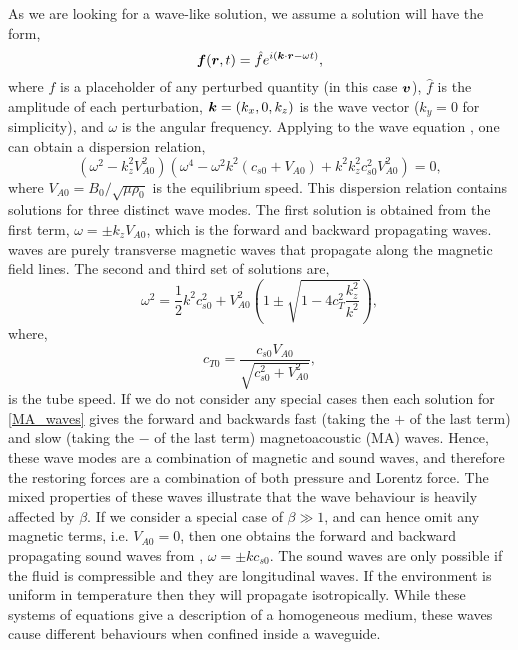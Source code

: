 As we are looking for a wave-like solution, we assume a solution will have the form,
\begin{equation}\label{wave_plane_sol}
    \boldsymbol{f}(\boldsymbol{r},t) = \hat{f} e^{i( \boldsymbol{k}\cdot \boldsymbol{r} - \omega t)},
\end{equation}
where $f$ is a placeholder of any perturbed quantity (in this case $\boldsymbol{v}$), $\hat{f}$ is the amplitude of each perturbation, $\boldsymbol{k}=(k_x,0,k_z)$ is the wave vector ($k_y=0$ for simplicity), and $\omega$ is the angular frequency. Applying  to the wave equation , one can obtain a dispersion relation,
\begin{equation}\label{disp_rel}
 (\omega^2-k^2_z V_{A0}^2)(\omega^4-\omega^2k^2(c_{s0}+V_{A0})+k^2 k^2_z c_{s0}^2 V_{A0}^2) = 0,
\end{equation}
where $V_{A0}=B_0/\sqrt{\mu \rho_0}$ is the equilibrium \Alfven speed. This dispersion relation contains solutions for three distinct wave modes. The first solution is obtained from the first term, $\omega=\pm k_z V_{A0}$, which is the forward and backward propagating \Alfven waves. \Alfven waves are purely transverse magnetic waves that propagate along the magnetic field lines. The second and third set of solutions are,
\begin{equation}\label{MA_waves}
    \omega^2 = \frac{1}{2} k^2{c_{s0}^2+V_{A0}^2} \left( 1 \pm \sqrt{1-4c^2_T \frac{ k^2_z}{k^2}}  \right),
\end{equation}
where, 
\begin{equation}
  c_{T0} = \frac{c_{s0}V_{A0}}{\sqrt{c_{s0}^2+V_{A0}^2}}, 
\end{equation}
is the tube speed. If we do not consider any special cases then each solution for \eqref{MA_waves} gives the forward and backwards fast (taking the $+$ of the last term) and slow (taking the $-$ of the last term) magnetoacoustic (MA) waves. Hence, these wave modes are a combination of magnetic and sound waves, and therefore the restoring forces are a combination of both pressure and Lorentz force. The mixed properties of these waves illustrate that the wave behaviour is heavily affected by $\beta$. If we consider a special case of $\beta \gg 1$, and can hence omit any magnetic terms, i.e. $V_{A0}=0$, then one obtains the forward and backward propagating sound waves from , $\omega = \pm k c_{s0}$. The sound waves are only possible if the fluid is compressible and they are longitudinal waves. If the environment is uniform in temperature then they will propagate isotropically. While these systems of equations give a description of a homogeneous medium, these waves cause different behaviours when confined inside a waveguide.
